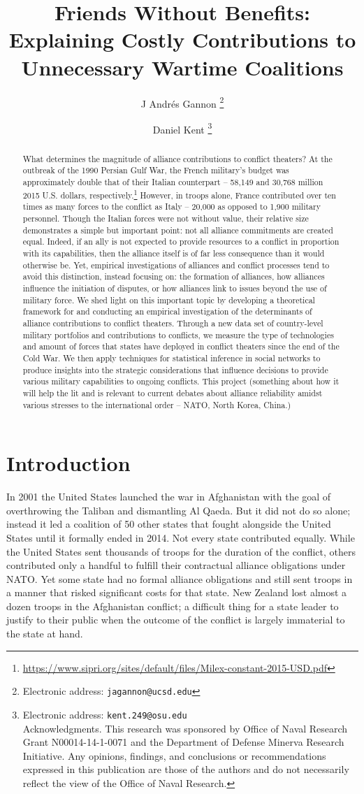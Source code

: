 \documentclass[12pt,letterpaper]{article}
\title{Friends Without Benefits: Explaining Costly Contributions to Unnecessary Wartime Coalitions}
\author{J Andr\'{e}s Gannon%
	\thanks{Electronic address: \texttt{jagannon@ucsd.edu}}}
\affil{Department of Political Science \\ University of California, San Diego}
\author{Daniel Kent%
	\thanks{Electronic address: \texttt{kent.249@osu.edu} \\ Acknowledgments. This research was sponsored by Office of Naval Research Grant N00014-14-1-0071 and the Department of Defense Minerva Research Initiative. Any opinions, findings, and conclusions or recommendations expressed in this publication are those of the authors and do not necessarily reflect the view of the Office of Naval Research.}}
\affil{Department of Political Science \\ Ohio State University}
\begin{document}
\maketitle

\begin{abstract}
What determines the magnitude of alliance contributions to conflict theaters? At the outbreak of the 1990 Persian Gulf War, the French military's budget was approximately double that of their Italian counterpart -- 58,149 and 30,768 million 2015 U.S. dollars, respectively.\footnote{\url{https://www.sipri.org/sites/default/files/Milex-constant-2015-USD.pdf}} However, in troops alone, France contributed over ten times as many forces to the conflict as Italy -- 20,000 as opposed to 1,900 military personnel. Though the Italian forces were not without value, their relative size demonstrates a simple but important point: not all alliance commitments are created equal. Indeed, if an ally is not expected to provide resources to a conflict in proportion with its capabilities, then the alliance itself is of far less consequence than it would otherwise be. Yet, empirical investigations of alliances and conflict processes tend
to avoid this distinction, instead focusing on: the formation of alliances, how alliances influence the initiation of disputes, or how alliances link to issues beyond the use of military force. We shed light on this important topic by developing a theoretical framework for and conducting an empirical investigation of the determinants of alliance contributions to conflict theaters. Through a new data set of country-level military portfolios and contributions to conflicts, we measure the type of technologies and amount of forces that states have deployed in conflict theaters since the end of the Cold War. We then apply techniques for statistical inference in social networks to produce insights into the strategic considerations that influence decisions to provide various military capabilities to ongoing conflicts. This project (something about how it will help the lit and is relevant to current debates about alliance reliability amidst various stresses to the international order -- NATO, North Korea, China.)
\end{abstract}

\section{Introduction}
	In 2001 the United States launched the war in Afghanistan with the goal of overthrowing the Taliban and dismantling Al Qaeda. But it did not do so alone; instead it led a coalition of 50 other states that fought alongside the United States until it formally ended in 2014. Not every state contributed equally. While the United States sent thousands of troops for the duration of the conflict, others contributed only a handful to fulfill their contractual alliance obligations under NATO. Yet some state had no formal alliance obligations and still sent troops in a manner that risked significant costs for that state. New Zealand lost almost a dozen troops in the Afghanistan conflict; a difficult thing for a state leader to justify to their public when the outcome of the conflict is largely immaterial to the state at hand.
	
\end{document}
